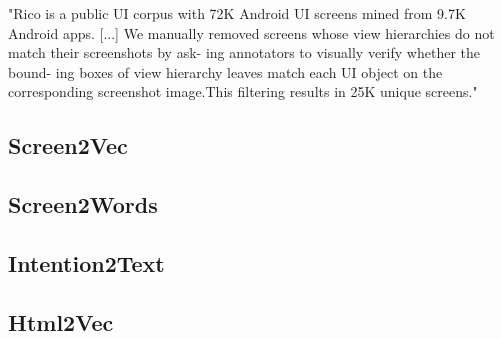 "Rico is a public UI corpus with 72K Android UI
screens mined from 9.7K Android apps. [...]
We manually removed screens whose view
hierarchies do not match their screenshots by ask-
ing annotators to visually verify whether the bound-
ing boxes of view hierarchy leaves match each UI
object on the corresponding screenshot image.This filtering results in 25K unique screens."

\subsection{Screen2Vec}

\subsection{Screen2Words}

\subsection{Intention2Text}

\subsection{Html2Vec}
